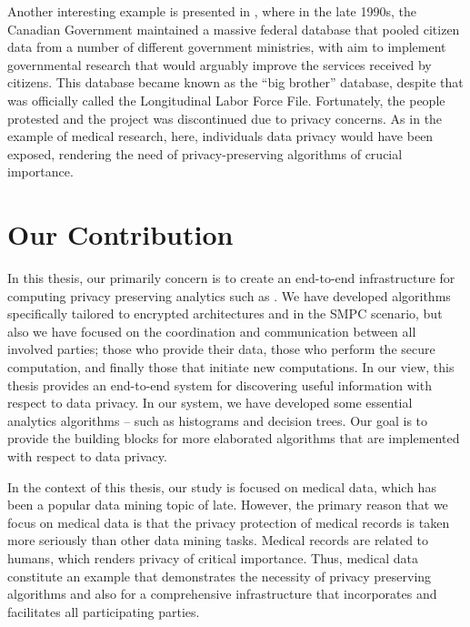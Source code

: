 Another interesting example is presented in \cite{lindell2000privacy}, where in the late 1990s, the Canadian Government maintained a massive federal database that pooled citizen data from a number of different government ministries, with aim to implement governmental research that would arguably improve the services received by citizens.
This database became known as the “big brother” database, despite that was officially called the Longitudinal Labor Force File.
Fortunately, the people protested and the project was discontinued due to privacy concerns.
As in the example of medical research, here, individuals data privacy would have been exposed, rendering the need of privacy-preserving algorithms of crucial importance.



\section{Our Contribution}\label{s:our-contribution}
In this thesis, our primarily concern is to create an end-to-end infrastructure for computing privacy preserving analytics such as \cite{lindell2000privacy, agrawal2000privacy}.
We have developed algorithms specifically tailored to encrypted architectures and in the SMPC scenario, but also we have focused on the coordination and communication between all involved parties; those who provide their data, those who perform the secure computation, and finally those that initiate new computations.
In our view, this thesis provides an end-to-end system for discovering useful information with respect to data privacy.
In our system, we have developed some essential analytics algorithms -- such as histograms and decision trees.
Our goal is to provide the building blocks for more elaborated algorithms that are implemented with respect to data privacy.


In the context of this thesis, our study is focused on medical data, which has been a popular data mining topic of late.
However, the primary reason that we focus on medical data is that the privacy protection of medical records is taken more seriously than other data mining tasks.
Medical records are related to humans, which renders privacy of critical importance.
Thus, medical data constitute an example that demonstrates the necessity of privacy preserving algorithms and also for a comprehensive infrastructure that incorporates and facilitates all participating parties.


